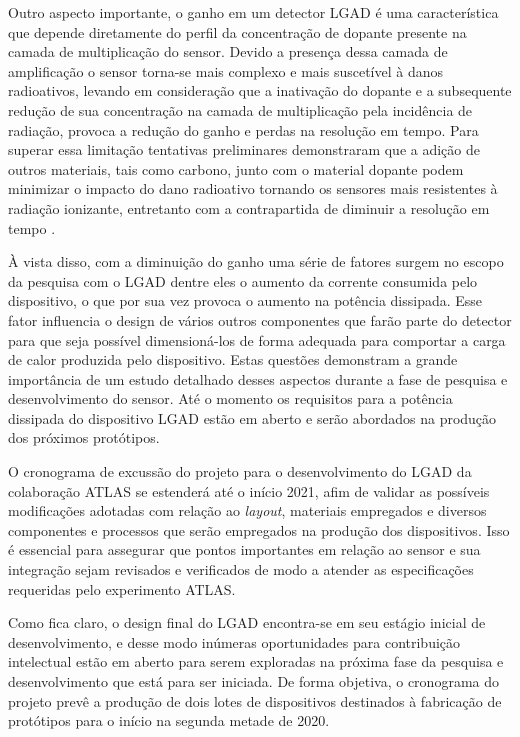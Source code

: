 Outro aspecto importante, o ganho em um detector LGAD é uma característica que depende diretamente do perfil da concentração de dopante presente na camada de multiplicação do sensor. Devido a presença dessa camada de amplificação o sensor torna-se mais complexo e mais suscetível à danos radioativos, levando em consideração que a inativação do dopante e a subsequente redução de sua concentração na camada de multiplicação pela incidência de radiação, provoca a redução do ganho e perdas na resolução em tempo. Para superar essa limitação tentativas preliminares demonstraram que a adição de outros materiais, tais como carbono, junto com o material dopante podem minimizar o impacto do dano radioativo tornando os sensores mais resistentes à radiação ionizante, entretanto com a contrapartida de diminuir a resolução em tempo \cite{tdr}. 

À vista disso, com a diminuição do ganho uma série de fatores surgem no escopo da pesquisa com o LGAD dentre eles o aumento da corrente consumida pelo dispositivo, o que por sua vez provoca o aumento na potência dissipada. Esse fator influencia o design de vários outros componentes que farão parte do detector para que seja possível dimensioná-los de forma adequada para comportar a carga de calor produzida pelo dispositivo. Estas questões  demonstram a grande importância de um estudo detalhado desses aspectos durante a fase de pesquisa e desenvolvimento do sensor. Até o momento os requisitos para a potência dissipada do dispositivo LGAD estão em aberto e serão abordados na produção dos próximos protótipos.

O cronograma de excussão do projeto para o desenvolvimento do LGAD da colaboração ATLAS se estenderá até o início 2021, afim de validar as possíveis modificações adotadas com relação ao {\it layout}, materiais empregados e diversos componentes e processos que serão empregados na produção dos dispositivos. Isso é essencial para assegurar que pontos importantes em relação ao sensor e sua integração sejam revisados e verificados de modo a atender as especificações requeridas pelo experimento ATLAS.

Como fica claro, o design final do LGAD encontra-se em seu estágio inicial de desenvolvimento, e desse modo inúmeras oportunidades para contribuição intelectual estão em aberto para serem exploradas na próxima fase da pesquisa e desenvolvimento que está para ser iniciada. De forma objetiva, o cronograma do projeto prevê a produção de dois lotes de dispositivos destinados à fabricação de protótipos para o início na segunda metade de 2020.%

